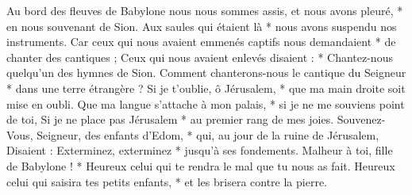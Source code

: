  Au bord des fleuves de Babylone nous nous sommes assis, et nous avons pleuré, * en nous souvenant de Sion.
\versseparator
 Aux saules qui étaient là * nous avons suspendu nos instruments.
\versseparator
 Car ceux qui nous avaient emmenés captifs nous demandaient * de chanter des cantiques ;
\versseparator
 Ceux qui nous avaient enlevés disaient : * Chantez-nous quelqu'un des hymnes de Sion.
\versseparator
 Comment chanterons-nous le cantique du Seigneur * dans une terre étrangère ?
\versseparator
 Si je t'oublie, ô Jérusalem, * que ma main droite soit mise en oubli.
\versseparator
 Que ma langue s'attache à mon palais, * si je ne me souviens point de toi,
\versseparator
 Si je ne place pas Jérusalem * au premier rang de mes joies.
\versseparator
 Souvenez-Vous, Seigneur, des enfants d'Edom, * qui, au jour de la ruine de Jérusalem,
\versseparator
 Disaient : Exterminez, exterminez * jusqu'à ses fondements.
\versseparator
 Malheur à toi, fille de Babylone ! * Heureux celui qui te rendra le mal que tu nous as fait.
\versseparator
 Heureux celui qui saisira tes petits enfants, * et les brisera contre la pierre.